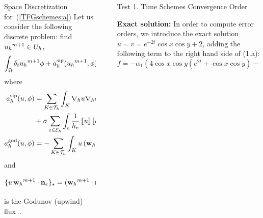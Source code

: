 \documentclass[final]{beamer}
\newlength{\sepwid}
\newlength{\onecolwid}
\begin{document}
\begin{frame}[t]
\begin{columns}[t]
\begin{column}{\onecolwid}
\begin{block}{Space Discretization for~(\ref{TFGschemes:a})}
        Let us consider the following discrete problem: find
        ${{u_{h}}^{m+1}}\in U_h$,
        \begin{equation}
        \label{discrete_problem_u}
          \int_\Omega \delta_t{{u_{h}}^{m+1}} \phi + a_h^{\mathrm{sip}}({{u_{h}}^{m+1}},\phi) + a_h^{\mathrm{god}}({{u_{h}}^{m+1}},\phi)=0 \quad \forall\phi\in U_h,
        \end{equation}
        where
        \begin{align*}
          \asip(u,\phi) &= \sum_{K\in\mathcal{T}_h}\int_K\nabla_h u\nabla_h \phi-\sum_{e\in\mathcal{E}_h}\int_e\left(\average{\nabla_h u\cdot\mathbf{n}_e}\jump{\phi}+\average{\nabla_h \phi\cdot\mathbf{n}_e}\jump{u}\right)\\&+\sigma\sum_{e\in\mathcal{E}_h}\int_e\frac{1}{h_e}\jump{u}\jump{\phi},
          \\
          \agod(u,\phi) &= -\sum_{K \in\mathcal{T}_h} \int_K u \, (\wwmm\cdot \grad\phi)
                            + \sum_{e\in\Eh}\{ u \, \wwmm \cdot \nn_e\}_\star
        \end{align*}
        and
        $$
        \{ u \, {{\mathbf{w}_{h}}^{m+1}} \cdot \mathbf{n}_e\}_\star=({{\mathbf{w}_{h}}^{m+1}}\cdot \mathbf{n}_e)\left(\frac{u|_{K_1}+u|_{K_2}}{2}\right)-\frac{1}{2}|{{\mathbf{w}_{h}}^{m+1}}\cdot\mathbf{n}_e|\left[\!\left[u\right]\!\right]
        $$
        is the Godunov (upwind) flux~\cite{anderson_high-order_2017}.

      \end{block}

    \end{column}



    \begin{column}{\sepwid}  \end{column}

    \vspace*{0.5cm}

    \begin{column}{\onecolwid} %

      \begin{block}{Test 1. Time Schemes Convergence Order}

        {\small
          \textbf{Exact solution:} In order to compute error orders, we introduce the exact solution $u=v=e^{-2t}\cos{x}\cos{y}+2$, adding the following term to the right hand side of (1.a):
          $$f=-\alpha_1 (4\cos{x}\cos{y}(e^{2t}+\cos{x}\cos{y})-\cos^2{x}-\cos^2{y})e^{-4t}.$$

}
\end{block}
\end{column}
\end{columns}
\end{frame}
\end{document}
